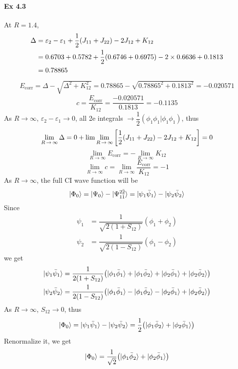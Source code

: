 \documentclass[a4paper]{article}
\DeclareMathOperator{\ra}{\rightarrow}
\DeclareMathOperator{\corr}{\mathrm{corr}}
\newcommand{\ex}[1]{\paragraph{Ex #1}}
\numberwithin{equation}{subsection}
\begin{document}
\ex{4.3}
At $ R = 1.4 $,
\begin{align}
\Delta &= \varepsilon_2 - \varepsilon_1 + \dfrac{1}{2}(J_{11} + J_{22}) - 2J_{12} + K_{12} \notag\\
&= 0.6703 + 0.5782 + \dfrac{1}{2}(0.6746 + 0.6975) - 2\times 0.6636 + 0.1813 \notag\\
&= 0.78865
\end{align}
\begin{align}
E_{\corr} = \Delta - \sqrt{\Delta^2 + K_{12}^2} = 0.78865 - \sqrt{0.78865^2 + 0.1813^2} = -0.020571
\end{align}
\begin{equation}\label{key}
c = \dfrac{E_{\corr}}{K_{12}} = \dfrac{-0.020571}{0.1813} = -0.1135
\end{equation}
As $ R\ra\infty $, $ \varepsilon_2 - \varepsilon_1 \ra 0 $, all 2e integrals $ \ra \dfrac{1}{2}(\phi_1\phi_1|\phi_1\phi_1) $, thus
\begin{align}
\lim\limits_{R\ra\infty}\Delta = 0 + \lim\lim\limits_{R\ra\infty} \qty[\dfrac{1}{2}(J_{11} + J_{22}) - 2J_{12} + K_{12}] = 0
\end{align}
\begin{equation}\label{key}
\lim\limits_{R\ra\infty} E_{\corr} =  -\lim\limits_{R\ra\infty} K_{12}
\end{equation}
\begin{equation}\label{key}
\lim\limits_{R\ra\infty} c = \lim\limits_{R\ra\infty} \dfrac{E_{\corr}}{K_{12}} = -1
\end{equation}
As $ R\ra\infty $, the full CI wave function will be
\begin{equation}\label{key}
\ket{\Phi_0} = \ket{\Psi_0} - \ket{\Psi_{1\bar{1}}^{2\bar{2}}} = \ket{\psi_1\bar\psi_1} - \ket{\psi_2\bar\psi_2}
\end{equation}
Since
\begin{align}
\psi_1 &= \dfrac{1}{\sqrt{2(1 + S_{12})}}(\phi_1 + \phi_2) \\
\psi_2 &= \dfrac{1}{\sqrt{2(1 - S_{12})}}(\phi_1 - \phi_2)
\end{align}
we get
\begin{align}
\ket{\psi_1\bar\psi_1} &= \dfrac{1}{2(1 + S_{12})} \qty(\ket{\phi_1\bar\phi_1} + \ket{\phi_1\bar\phi_2} + \ket{\phi_2\bar\phi_1} + \ket{\phi_2\bar\phi_2}) \\
\ket{\psi_2\bar\psi_2} &= \dfrac{1}{2(1 - S_{12})} \qty(\ket{\phi_1\bar\phi_1} - \ket{\phi_1\bar\phi_2} - \ket{\phi_2\bar\phi_1} + \ket{\phi_2\bar\phi_2})
\end{align}
As $ R\ra\infty $, $ S_{12}\ra 0 $, thus
\begin{align}
\ket{\Phi_0} = \ket{\psi_1\bar\psi_1} - \ket{\psi_2\bar\psi_2} = \dfrac{1}{2}\qty(\ket{\phi_1\bar\phi_2} + \ket{\phi_2\bar\phi_1})
\end{align}
Renormalize it, we get
\begin{equation}\label{key}
\ket{\Phi_0} = \dfrac{1}{\sqrt{2}}\qty(\ket{\phi_1\bar\phi_2} + \ket{\phi_2\bar\phi_1})
\end{equation}
\end{document}
